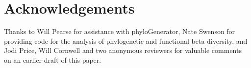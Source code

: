 \section*{Acknowledgements}

Thanks to Will Pearse for assistance with phyloGenerator, Nate Swenson for providing code for the analysis of phylogenetic and functional beta diversity, and Jodi Price, Will Cornwell and two anonymous reviewers for valuable comments on an earlier draft of this paper.

